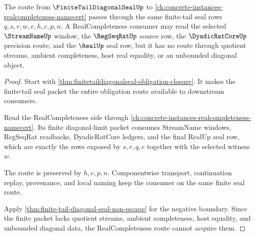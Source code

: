 \begin{theorem}
\label{thm:finitetaildiagonalseal-realcompleteness-route}
The route from $\FiniteTailDiagonalSealUp$ to \autoref{ch:concrete-instances-realcompleteness-namecert} passes through the same finite-tail seal rows $q,s,r,w,e,h,c,p,n$. A RealCompleteness consumer may read the selected $\StreamNameUp$ window, the $\RegSeqRatUp$ source row, the $\DyadicRatCoreUp$ precision route, and the $\RealUp$ seal row, but it has no route through quotient streams, ambient completeness, host real equality, or an unbounded diagonal object.
\end{theorem}
\begin{proof}
Start with \autoref{thm:finitetaildiagonalseal-obligation-closure}. It makes the finite-tail seal packet the entire obligation route available to downstream consumers.

Read the RealCompleteness side through \autoref{ch:concrete-instances-realcompleteness-namecert}. Its finite diagonal-limit packet consumes StreamName windows, RegSeqRat readbacks, DyadicRatCore ledgers, and the final RealUp seal row, which are exactly the rows exposed by $s,r,q,e$ together with the selected witness $w$.

The route is preserved by $h,c,p,n$. Componentwise transport, continuation replay, provenance, and local naming keep the consumer on the same finite seal route.

Apply \autoref{thm:finite-tail-diagonal-seal-non-escape} for the negative boundary. Since the finite packet lacks quotient streams, ambient completeness, host equality, and unbounded diagonal data, the RealCompleteness route cannot acquire them.
\end{proof}

